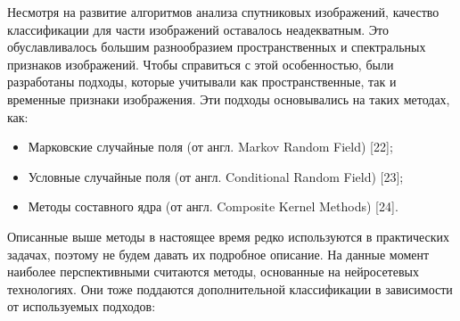 \documentclass[14pt, russian]{scrartcl}
\begin{document}
Несмотря на развитие алгоритмов анализа спутниковых изображений, качество классификации для части изображений оставалось неадекватным. Это обуславливалось большим разнообразием пространственных и спектральных признаков изображений. Чтобы справиться с этой особенностью, были разработаны подходы, которые учитывали как пространственные, так и временные признаки изображения. Эти подходы основывались на таких методах, как:

\begin{itemize}
    \item Марковские случайные поля (от англ. Markov Random Field) [22];
    \item Условные случайные поля (от англ. Conditional Random Field) [23];
    \item Методы составного ядра (от англ. Composite Kernel Methods) [24].
\end{itemize}

Описанные выше методы в настоящее время редко используются в практических задачах, поэтому не будем давать их подробное описание. На данные момент наиболее перспективными считаются методы, основанные на нейросетевых технологиях. Они тоже поддаются дополнительной классификации в зависимости от используемых подходов:
\end{document}
